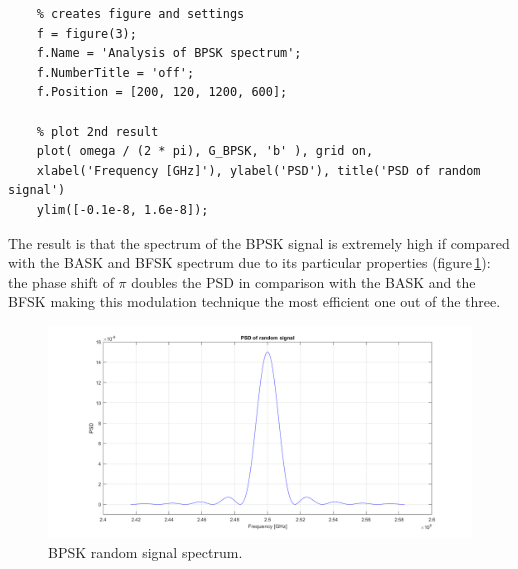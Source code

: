 \begin{lstlisting}
    % creates figure and settings
    f = figure(3);
    f.Name = 'Analysis of BPSK spectrum';
    f.NumberTitle = 'off';
    f.Position = [200, 120, 1200, 600];

    % plot 2nd result
    plot( omega / (2 * pi), G_BPSK, 'b' ), grid on,
    xlabel('Frequency [GHz]'), ylabel('PSD'), title('PSD of random signal')
    ylim([-0.1e-8, 1.6e-8]);
\end{lstlisting}

\noindent The result is that the spectrum of the BPSK signal is extremely high if compared with the BASK and BFSK spectrum due to its particular properties (figure\,\ref{fig:random-signal-spectrum}): the phase shift of $\pi$ doubles the PSD in comparison with the BASK and the BFSK making this modulation technique the most efficient one out of the three.

\begin{figure}[h]
    \centering
    \includegraphics[width = \textwidth]{../res/imgs/random-signal-spectrum.png}
    \caption{BPSK random signal spectrum.}
    \label{fig:random-signal-spectrum}
\end{figure}